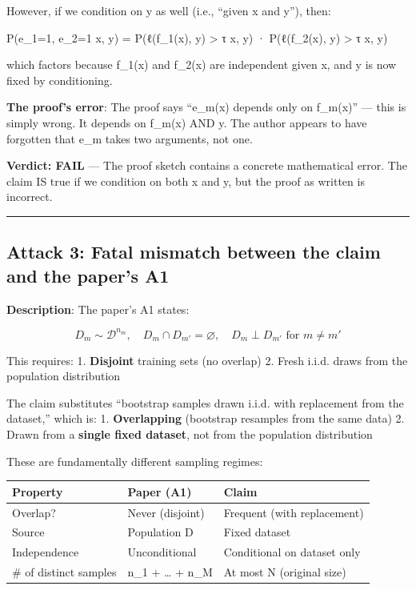 \documentclass[
  12pt,
]{article}
\begin{document}
However, if we condition on y as well (i.e., ``given x and y''), then:

P(e\_1=1, e\_2=1 \textbar{} x, y) = P(ℓ(f\_1(x), y) \textgreater{} τ
\textbar{} x, y) · P(ℓ(f\_2(x), y) \textgreater{} τ \textbar{} x, y)

which factors because f\_1(x) and f\_2(x) are independent given x, and y
is now fixed by conditioning.

\textbf{The proof's error}: The proof says ``e\_m(x) depends only on
f\_m(x)'' --- this is simply wrong. It depends on f\_m(x) AND y. The
author appears to have forgotten that e\_m takes two arguments, not one.

\textbf{Verdict: FAIL} --- The proof sketch contains a concrete
mathematical error. The claim IS true if we condition on both x and y,
but the proof as written is incorrect.

\begin{center}\rule{0.5\linewidth}{0.5pt}\end{center}

\subsection{Attack 3: Fatal mismatch between the claim and the paper's
A1}\label{attack-3-fatal-mismatch-between-the-claim-and-the-papers-a1}

\textbf{Description}: The paper's A1 states:

\[D_m \sim \mathcal{D}^{n_m}, \quad D_m \cap D_{m'} = \varnothing, \quad D_m \perp D_{m'} \text{ for } m \neq m'\]

This requires: 1. \textbf{Disjoint} training sets (no overlap) 2. Fresh
i.i.d. draws from the population distribution

The claim substitutes ``bootstrap samples drawn i.i.d. with replacement
from the dataset,'' which is: 1. \textbf{Overlapping} (bootstrap
resamples from the same data) 2. Drawn from a \textbf{single fixed
dataset}, not from the population distribution

These are fundamentally different sampling regimes:

\begin{longtable}[]{@{}lll@{}}
\toprule\noalign{}
Property & Paper (A1) & Claim \\
\midrule\noalign{}
\endhead
\bottomrule\noalign{}
\endlastfoot
Overlap? & Never (disjoint) & Frequent (with replacement) \\
Source & Population D & Fixed dataset \\
Independence & Unconditional & Conditional on dataset only \\
\# of distinct samples & n\_1 + \ldots{} + n\_M & At most N (original
size) \\
\end{longtable}
\end{document}
